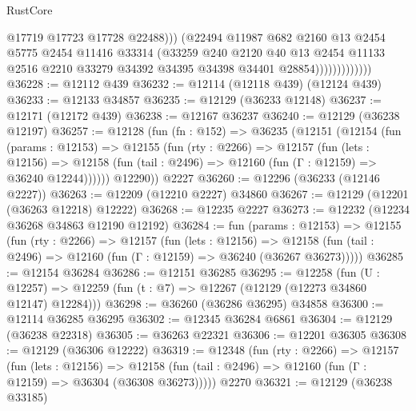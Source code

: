 \begin{lexlean}{RustCore}
\begin{coremodule}
                                @17719
                                @17723
                                @17728
                                @22488)))
                          (@22494
                            @11987
                            @682
                            @2160
                            @13
                            @2454
                            @5775
                            @2454
                            @11416
                            @33314
                            (@33259
                              @240
                              @2120
                              @40
                              @13
                              @2454
                              @11133
                              @2516
                              @2210
                              @33279
                              @34392
                              @34395
                              @34398
                              @34401
                              @28854)))))))))))))
@36228 := @12112 @439
@36232 := @12114 (@12118 @439) (@12124 @439)
@36233 := @12133 @34857
@36235 := @12129 (@36233 @12148)
@36237 := @12171 (@12172 @439)
@36238 := @12167 @36237
@36240 := @12129 (@36238 @12197)
@36257 := @12128
    (fun (fn : @152) =>
    @36235
      (@12151
        (@12154
          (fun (params : @12153) =>
          @12155
            (fun (rty : @2266) =>
            @12157
              (fun (lets : @12156) =>
              @12158 (fun (tail : @2496) => @12160 (fun (Γ : @12159) => @36240 @12244))))))
        @12290))
    @2227
@36260 := @12296 (@36233 (@12146 @2227))
@36263 := @12209 (@12210 @2227) @34860
@36267 := @12129 (@12201 (@36263 @12218) @12222)
@36268 := @12235 @2227
@36273 := @12232 (@12234 @36268 @34863 @12190 @12192)
@36284 := fun (params : @12153) =>
  @12155
    (fun (rty : @2266) =>
    @12157
      (fun (lets : @12156) =>
      @12158 (fun (tail : @2496) => @12160 (fun (Γ : @12159) => @36240 (@36267 @36273)))))
@36285 := @12154 @36284
@36286 := @12151 @36285
@36295 := @12258
    (fun (U : @12257) => @12259 (fun (t : @7) => @12267 (@12129 (@12273 @34860 @12147) @12284)))
@36298 := @36260 (@36286 @36295) @34858
@36300 := @12114 @36285 @36295
@36302 := @12345 @36284 @6861
@36304 := @12129 (@36238 @22318)
@36305 := @36263 @22321
@36306 := @12201 @36305
@36308 := @12129 (@36306 @12222)
@36319 := @12348
    (fun (rty : @2266) =>
    @12157
      (fun (lets : @12156) =>
      @12158 (fun (tail : @2496) => @12160 (fun (Γ : @12159) => @36304 (@36308 @36273)))))
    @2270
@36321 := @12129 (@36238 @33185)

\end{coremodule}
\end{lexlean}

